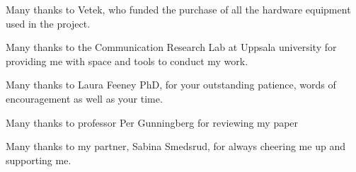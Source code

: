 Many thanks to Vetek, who funded the purchase of all the hardware equipment used in the project.

Many thanks to the Communication Research Lab at Uppsala university for providing me with space and tools to conduct my work.

Many thanks to Laura Feeney PhD, for your outstanding patience, words of encouragement as well as your time. 

Many thanks to professor Per Gunningberg for reviewing my paper

Many thanks to my partner, Sabina Smedsrud, for always cheering me up and supporting me.